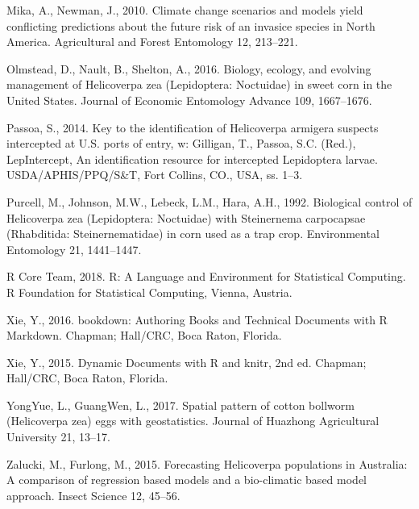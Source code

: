 \documentclass[polish,a4paper]{article}
\begin{document}
\hypertarget{ref-mika2010}{}
Mika, A., Newman, J., 2010. Climate change scenarios and models yield
conflicting predictions about the future risk of an invasice species in
North America. Agricultural and Forest Entomology 12, 213--221.

\hypertarget{ref-olmstead2016}{}
Olmstead, D., Nault, B., Shelton, A., 2016. Biology, ecology, and
evolving management of Helicoverpa zea (Lepidoptera: Noctuidae) in sweet
corn in the United States. Journal of Economic Entomology Advance 109,
1667--1676.

\hypertarget{ref-passoa2014}{}
Passoa, S., 2014. Key to the identification of Helicoverpa armigera
suspects intercepted at U.S. ports of entry, w: Gilligan, T., Passoa,
S.C. (Red.), LepIntercept, An identification resource for intercepted
Lepidoptera larvae. USDA/APHIS/PPQ/S\&T, Fort Collins, CO., USA, ss.
1--3.

\hypertarget{ref-purcell1992}{}
Purcell, M., Johnson, M.W., Lebeck, L.M., Hara, A.H., 1992. Biological
control of Helicoverpa zea (Lepidoptera: Noctuidae) with Steinernema
carpocapsae (Rhabditida: Steinernematidae) in corn used as a trap crop.
Environmental Entomology 21, 1441--1447.

\hypertarget{ref-rcore2018}{}
R Core Team, 2018. R: A Language and Environment for Statistical
Computing. R Foundation for Statistical Computing, Vienna, Austria.

\hypertarget{ref-xie2016}{}
Xie, Y., 2016. bookdown: Authoring Books and Technical Documents with R
Markdown. Chapman; Hall/CRC, Boca Raton, Florida.

\hypertarget{ref-xie2015}{}
Xie, Y., 2015. Dynamic Documents with R and knitr, 2nd ed. Chapman;
Hall/CRC, Boca Raton, Florida.

\hypertarget{ref-luliang2002}{}
YongYue, L., GuangWen, L., 2017. Spatial pattern of cotton bollworm
(Helicoverpa zea) eggs with geostatistics. Journal of Huazhong
Agricultural University 21, 13--17.

\hypertarget{ref-zalucki2005}{}
Zalucki, M., Furlong, M., 2015. Forecasting Helicoverpa populations in
Australia: A comparison of regression based models and a bio-climatic
based model approach. Insect Science 12, 45--56.
\end{document}
